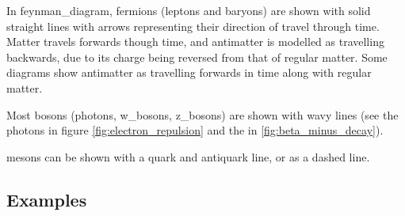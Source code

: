     In \gls{feynman_diagram}, \glspl{fermion} (\glspl{lepton} and \glspl{baryon}) are shown with solid straight lines with arrows representing their direction of travel through time.
    Matter travels forwards though time, and antimatter is modelled as travelling backwards, due to its charge being reversed from that of regular matter.
    Some diagrams show antimatter as travelling forwards in time along with regular matter.

    Most \glspl{boson} (\glspl{photon}, \glspl{w_boson}, \glspl{z_boson}) are shown with wavy lines (see the \glspl{photon} in figure \ref{fig:electron_repulsion} and the  in \ref{fig:beta_minus_decay}).
    
    \Glspl{meson} can be shown with a \gls{quark} and \gls{antiquark} line, or as a dashed line.

    \subsection{Examples}
